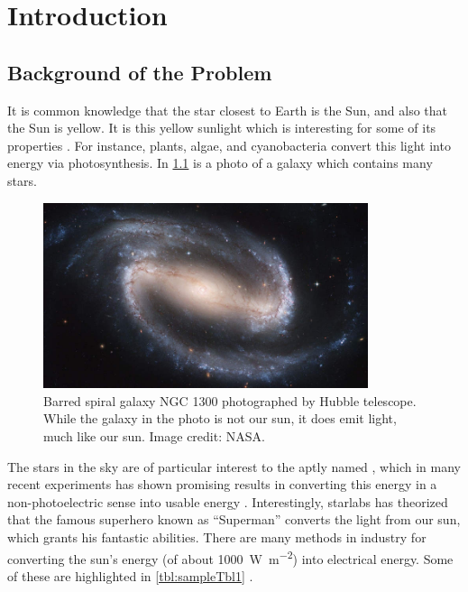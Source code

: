 
\chapter{Introduction}
\begin{refsection}
\section{Background of the Problem}

It is common knowledge that the star closest to Earth is the Sun, and also that the Sun is yellow. It is this yellow sunlight which is interesting for some of its properties \cite{onate_exploring_2021}. For instance, plants, algae, and cyanobacteria convert this light into energy via photosynthesis. In \ref{fig:firstFig} is a photo of a galaxy which contains many stars.

\begin{figure}[ht]
    \centering
	\includegraphics[width=0.85\textwidth]{figures/sampleFig1.jpg} 
	\caption[Barred spiral galaxy NGC 1300]{Barred spiral galaxy NGC 1300 photographed by Hubble telescope. While the galaxy in the photo is not our sun, it does emit light, much like our sun. Image credit: NASA.}
	\label{fig:firstFig}
\end{figure}

The stars in the sky are of particular interest to the aptly named , which in many recent experiments has shown promising results in converting this energy in a non-photoelectric sense into usable energy \cite{ssdsdsd_solid_2012}. Interestingly, \gls{starlabs} has theorized that the famous superhero known as ``Superman'' converts the light from our sun, which grants his fantastic abilities. There are many methods in industry for converting the sun's energy (of about \SI{1000}{\watt\per\meter\squared}) into electrical energy. Some of these are highlighted in \ref{tbl:sampleTbl1} \cite{noauthor_techopedia_nodate}.


\end{refsection}
